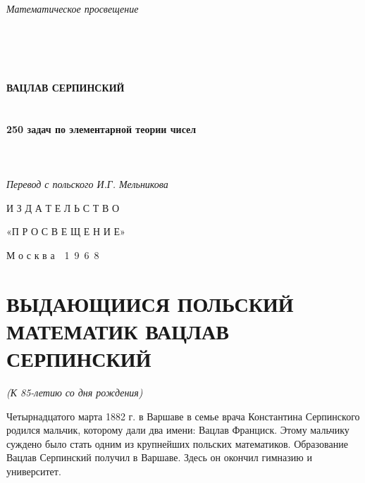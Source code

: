 \documentclass[12pt, a4paper, openany]{book}
\begin{document}
	
	\begin{titlepage}
		
		\begin{center}
			
			\vspace*{\fill}
			\begin{flushleft}
		{\large	\textit{Математическое просвещение}			}
			\end{flushleft}
			\ \\
\ \\
			\ \\
\ \\
			{\large\bf ВАЦЛАВ СЕРПИНСКИЙ\\}
			\ \\
			\ \\
			{\Huge\bf 250 задач по элементарной теории чисел\\}
			\ \\
			\ \\
			\ \\
			\textit{Перевод с польского И.Г. Мельникова}

			\vspace*{\fill}    
			
			\vfill
			
И З Д А Т Е Л Ь С Т В О

«П Р О С В Е Щ Е Н И Е»

М о с к в а\ \ 1\ 9\ 6\ 8
		\end{center}
		
	\end{titlepage}
	
	\thispagestyle{empty} %
	
	\newpage
	
\setcounter{secnumdepth}{0}  
	
	\section[Выдающийся польский математик Вацлав Серпинский (к 85-летию со дня рождения)]{\center ВЫДАЮЩИИСЯ ПОЛЬСКИЙ МАТЕМАТИК ВАЦЛАВ СЕРПИНСКИЙ}
		\begin{center}
\textit{(К 85-летию со дня рождения)}
\end{center}
	
	Четырнадцатого марта 1882 г. в Варшаве в семье врача Константина Серпинского родился мальчик, которому дали два имени: Вацлав Франциск. Этому мальчику суждено было стать одним из крупнейших польских математиков.
	Образование Вацлав Серпинский получил в Варшаве. Здесь он окончил гимназию и университет.
\end{document}

